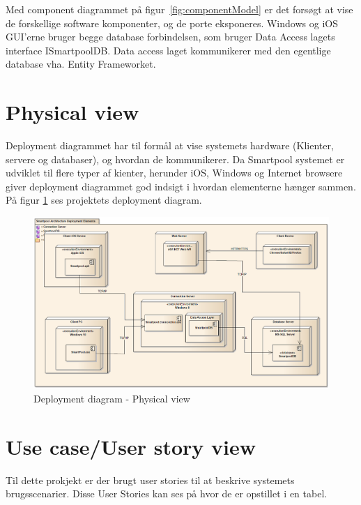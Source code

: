 Med component diagrammet på figur~\ref{fig:componentModel} er det forsøgt at vise de forskellige software komponenter, og de porte eksponeres. Windows og iOS GUI'erne bruger begge database forbindelsen, som bruger Data Access lagets interface ISmartpoolDB. Data access laget kommunikerer med den egentlige database vha. Entity Frameworket.

\section{Physical view}
 
Deployment diagrammet har til formål at vise systemets hardware (Klienter, servere og databaser), og hvordan de kommunikerer. Da Smartpool systemet er udviklet til flere typer af kienter, herunder iOS, Windows og Internet browsere giver deployment diagrammet god indsigt i hvordan elementerne hænger sammen.
På figur \ref{fig:deploymentView} ses projektets deployment diagram.

\begin{figure}
	\centering
	\includegraphics[width=\linewidth]{figs/arkitektur/deploymentView.PNG}
	\caption{Deployment diagram - Physical view}
	\label{fig:deploymentView}
\end{figure}

\section{Use case/User story view}
Til dette prokjekt er der brugt user stories til at beskrive systemets brugsscenarier. Disse User Stories kan ses på  hvor de er opstillet i en tabel.

